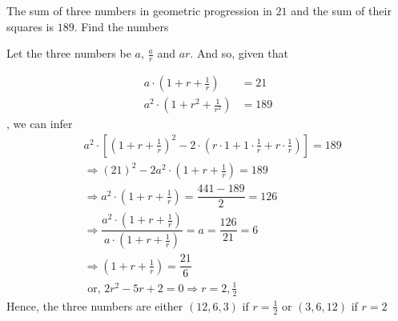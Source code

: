 


\question[4] The sum of three numbers in geometric progression in $21$ and the sum of their
squares is $189$. Find the numbers


\ifprintanswers
\fi

\begin{solution}[\fullpage]
	Let the three numbers be $a$, $\frac{a}{r}$ and $ar$. And so, given that
	
	\begin{align}
		a\cdot\left( 1 + r + \frac{1}{r} \right) &= 21 \\
		a^2\cdot\left( 1 + r^2 + \frac{1}{r^2} \right) &= 189
	\end{align}
	, we can infer 
	\begin{align}
		&a^2\cdot\left[ \left( 1 + r + \frac{1}{r} \right)^2 - 
		2\cdot\left( r\cdot1 + 1\cdot\frac{1}{r} + r\cdot\frac{1}{r} \right)\right] = 189 \\
		&\Rightarrow (21)^2 - 2a^2\cdot\left( 1 + r + \frac{1}{r} \right) = 189 \\
		&\Rightarrow a^2\cdot\left( 1 + r + \frac{1}{r} \right) = \dfrac{441-189}{2} = 126 \\
		&\Rightarrow \dfrac{a^2\cdot\left( 1 + r + \frac{1}{r} \right)}
		{a\cdot\left( 1 + r + \frac{1}{r} \right)} = a = \dfrac{126}{21} = 6 \\
		&\Rightarrow \left( 1 + r + \frac{1}{r} \right) = \dfrac{21}{6} \\
		&\text{ or, } 2r^2 - 5r + 2 = 0 \Rightarrow r = 2, \frac{1}{2}
	\end{align}
	Hence, the three numbers are either $(12,6,3)$ if $r=\frac{1}{2}$ or $(3,6,12)$ if $r=2$
\end{solution}
